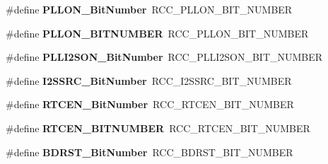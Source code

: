 \begin{DoxyCompactItemize}
\item 
\hypertarget{group___h_a_l___r_c_c___aliased_gab24d7f5f8e4b3b717fd91b54f393f6a3}{\#define {\bfseries P\-L\-L\-O\-N\-\_\-\-Bit\-Number}~R\-C\-C\-\_\-\-P\-L\-L\-O\-N\-\_\-\-B\-I\-T\-\_\-\-N\-U\-M\-B\-E\-R}\label{group___h_a_l___r_c_c___aliased_gab24d7f5f8e4b3b717fd91b54f393f6a3}

\item 
\hypertarget{group___h_a_l___r_c_c___aliased_ga1360ce96541cc7c323d3ea4b5b885a64}{\#define {\bfseries P\-L\-L\-O\-N\-\_\-\-B\-I\-T\-N\-U\-M\-B\-E\-R}~R\-C\-C\-\_\-\-P\-L\-L\-O\-N\-\_\-\-B\-I\-T\-\_\-\-N\-U\-M\-B\-E\-R}\label{group___h_a_l___r_c_c___aliased_ga1360ce96541cc7c323d3ea4b5b885a64}

\item 
\hypertarget{group___h_a_l___r_c_c___aliased_gabae59c3e4200523e3aa5b6e10aee8c46}{\#define {\bfseries P\-L\-L\-I2\-S\-O\-N\-\_\-\-Bit\-Number}~R\-C\-C\-\_\-\-P\-L\-L\-I2\-S\-O\-N\-\_\-\-B\-I\-T\-\_\-\-N\-U\-M\-B\-E\-R}\label{group___h_a_l___r_c_c___aliased_gabae59c3e4200523e3aa5b6e10aee8c46}

\item 
\hypertarget{group___h_a_l___r_c_c___aliased_ga9561d436b438d8f513b754f1934c3e30}{\#define {\bfseries I2\-S\-S\-R\-C\-\_\-\-Bit\-Number}~R\-C\-C\-\_\-\-I2\-S\-S\-R\-C\-\_\-\-B\-I\-T\-\_\-\-N\-U\-M\-B\-E\-R}\label{group___h_a_l___r_c_c___aliased_ga9561d436b438d8f513b754f1934c3e30}

\item 
\hypertarget{group___h_a_l___r_c_c___aliased_ga9302c551752124766afc4cee65436405}{\#define {\bfseries R\-T\-C\-E\-N\-\_\-\-Bit\-Number}~R\-C\-C\-\_\-\-R\-T\-C\-E\-N\-\_\-\-B\-I\-T\-\_\-\-N\-U\-M\-B\-E\-R}\label{group___h_a_l___r_c_c___aliased_ga9302c551752124766afc4cee65436405}

\item 
\hypertarget{group___h_a_l___r_c_c___aliased_ga58db3c6eeaa150182f32e741e2ad8066}{\#define {\bfseries R\-T\-C\-E\-N\-\_\-\-B\-I\-T\-N\-U\-M\-B\-E\-R}~R\-C\-C\-\_\-\-R\-T\-C\-E\-N\-\_\-\-B\-I\-T\-\_\-\-N\-U\-M\-B\-E\-R}\label{group___h_a_l___r_c_c___aliased_ga58db3c6eeaa150182f32e741e2ad8066}

\item 
\hypertarget{group___h_a_l___r_c_c___aliased_gae6718158034388d8fde8caaa28ffe8b9}{\#define {\bfseries B\-D\-R\-S\-T\-\_\-\-Bit\-Number}~R\-C\-C\-\_\-\-B\-D\-R\-S\-T\-\_\-\-B\-I\-T\-\_\-\-N\-U\-M\-B\-E\-R}\label{group___h_a_l___r_c_c___aliased_gae6718158034388d8fde8caaa28ffe8b9}


\end{DoxyCompactItemize}

